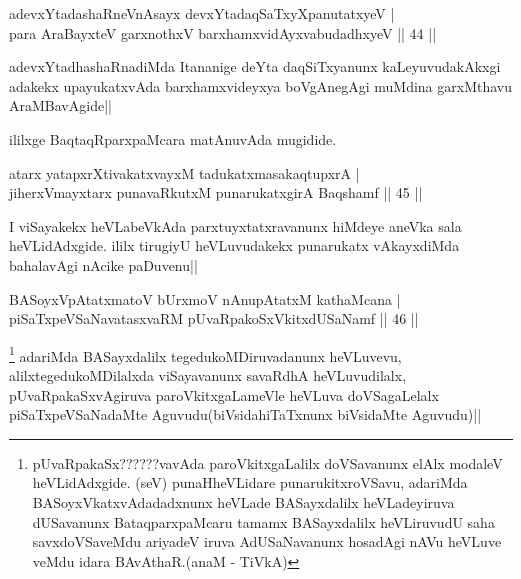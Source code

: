 \begin{shl}
adevxYtadashaRneVnAsayx devxYtadaqSaTxyXpanutatxyeV |\\
para AraBayxteV garxnothxV barxhamxvidAyxvabudadhxyeV \hfill || 44 ||
\end{shl}

\begin{artha}
adevxYtadhashaRnadiMda Itananige deYta daqSiTxyanunx kaLeyuvudakAkxgi adakekx upayukatxvAda barxhamxvideyxya boVgAnegAgi muMdina garxMthavu AraMBavAgide||
\end{artha}

\begin{center}
ililxge BaqtaqRparxpaMcara matAnuvAda mugidide.
\end{center}


\begin{shl}
atarx yatapxrXtivakatxvayxM tadukatxmasakaqtupxrA |\\
jiherxVmayxtarx punavaRkutxM punarukatxgirA Baqshamf \hfill || 45 ||
\end{shl}

\begin{artha}
I viSayakekx heVLabeVkAda parxtuyxtatxravanunx hiMdeye aneVka sala heVLidAdxgide. ililx 
tirugiyU heVLuvudakekx punarukatx vAkayxdiMda bahalavAgi nAcike paDuvenu||
\end{artha}
	
\begin{shl}
BASoyxVpAtatxmatoV bUrxmoV nAnupAtatxM kathaMcana |\\
piSaTxpeVSaNavatasxvaRM pUvaRpakoSxVkitxdUSaNamf \hfill || 46 ||
\end{shl}

\begin{artha}
\footnote{pUvaRpakaSx??????vavAda paroVkitxgaLalilx doVSavanunx elAlx modaleV heVLidAdxgide. (seV) punaHheVLidare punarukitxroVSavu, adariMda BASoyxVkatxvAdadadxnunx heVLade BASayxdalilx heVLadeyiruva dUSavanunx BataqparxpaMcaru tamamx BASayxdalilx heVLiruvudU saha savxdoVSaveMdu ariyadeV iruva AdUSaNavanunx hosadAgi nAVu heVLuve veMdu idara BAvAthaR.(anaM - TiVkA)} adariMda BASayxdalilx tegedukoMDiruvadanunx heVLuvevu, alilxtegedukoMDilalxda viSayavanunx savaRdhA heVLuvudilalx, pUvaRpakaSxvAgiruva paroVkitxgaLameVle heVLuva doVSagaLelalx piSaTxpeVSaNadaMte Aguvudu(biVsidahiTaTxnunx biVsidaMte Aguvudu)||
\end{artha}


